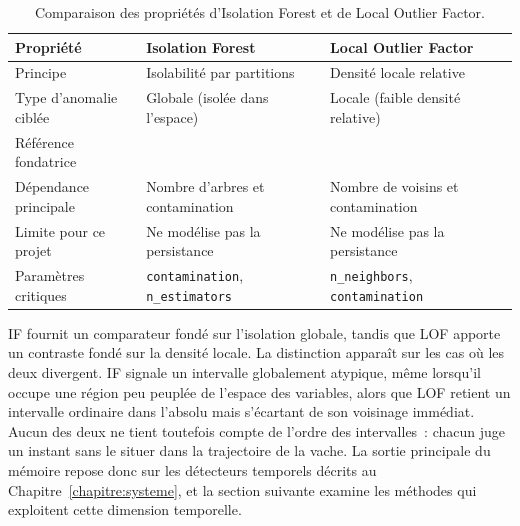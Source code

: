 \begin{table}[H]
    \centering
    \caption{Comparaison des propriétés d'Isolation Forest et de Local Outlier Factor.}
    \label{tab:if_vs_lof}
    \small
    \begin{tabular}{>{\raggedright\arraybackslash}p{3.6cm}
                    >{\raggedright\arraybackslash}p{5.8cm}
                    >{\raggedright\arraybackslash}p{5.8cm}}
        \toprule
        \textbf{Propriété}            & \textbf{Isolation Forest}
            & \textbf{Local Outlier Factor} \\
        \midrule
        Principe                      & Isolabilité par partitions
            & Densité locale relative \\
        Type d'anomalie ciblée        & Globale (isolée dans l'espace)
            & Locale (faible densité relative) \\
        Référence fondatrice          & \citep{liu2008isolation}
            & \citep{breunig2000lof} \\
        Dépendance principale         & Nombre d'arbres et contamination
            & Nombre de voisins et contamination \\
        Limite pour ce projet         & Ne modélise pas la persistance
            & Ne modélise pas la persistance \\
        Paramètres critiques          & \texttt{contamination}, \texttt{n\_estimators}
            & \texttt{n\_neighbors}, \texttt{contamination} \\
        \bottomrule
    \end{tabular}
\end{table}

IF fournit un comparateur fondé sur l'isolation globale, tandis que LOF apporte un contraste
fondé sur la densité locale. La distinction apparaît sur les cas où les deux divergent. IF
signale un intervalle globalement atypique, même lorsqu'il occupe une région peu peuplée de
l'espace des variables, alors que LOF retient un intervalle ordinaire dans l'absolu mais
s'écartant de son voisinage immédiat. Aucun des deux ne tient toutefois compte de l'ordre des
intervalles~: chacun juge un instant sans le situer dans la trajectoire de la vache. La sortie
principale du mémoire repose donc sur les détecteurs temporels décrits au
Chapitre~\ref{chapitre:systeme}, et la section suivante examine les méthodes qui exploitent
cette dimension temporelle.

